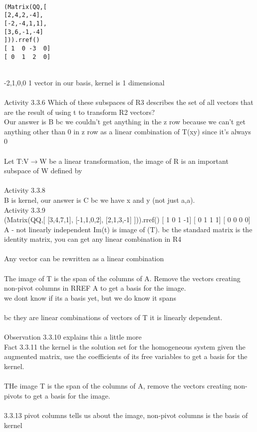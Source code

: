 \documentclass{article}
\begin{document}
\\
\begin{verbatim}
(Matrix(QQ,[
[2,4,2,-4],
[-2,-4,1,1],
[3,6,-1,-4]
])).rref()
[ 1  0 -3  0]
[ 0  1  2  0]
\end{verbatim}\\
-2,1,0,0
1 vector in our basis, kernel is 1 dimensional\\
\\
Activity 3.3.6 Which of these subspaces of R3 describes the set of all vectors that are the result of using t to transform R2 vectors?\\
Our answer is B bc we couldn't get anything in the z row because we can't get anything other than 0 in z row as a linear combination of T(xy) since it's always 0\\
\\
Let T:V$\rightarrow$W be a linear transformation, the image of R is an important subspace of W defined by\\
\\
Activity 3.3.8 \\
B is kernel, our answer is C bc we have x and y (not just a,a). 
\\
Activity 3.3.9\\
(Matrix(QQ,[
[3,4,7,1],
[-1,1,0,2],
[2,1,3,-1]
])).rref()
[ 1  0  1 -1]
[ 0  1  1  1]
[ 0  0  0  0]\\
A - not linearly independent
Im(t) is image of (T).
bc the standard matrix is the identity matrix, you can get any linear combination in R4\\
\\
Any vector can be rewritten as a linear combination \\
\\
The image of T is the span of the columns of A. Remove the vectors
creating non-pivot columns in RREF A to get a basis for the image.\\
we dont know if its a basis yet, but we do know it spans\\
\\
bc they are linear combinations of vectors of T it is linearly dependent.\\
\\
Observation 3.3.10 explains this a little more\\
Fact 3.3.11 the kernel is the solution set for the homogeneous system given the augmented matrix, use the coefficients of its free variables to get a basis for the kernel.\\
\\
THe image T is the span of the columns of A, remove the vectors creating non-pivots to get a basis for the image.\\
\\
3.3.13 pivot columns tells us about the image, non-pivot columns is the basis of kernel
\end{document}
